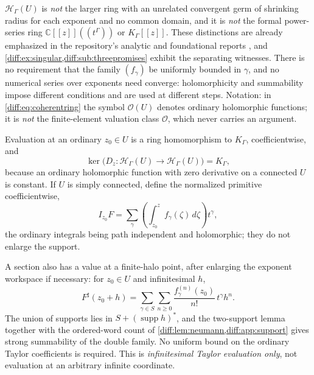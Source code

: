 \documentclass[11pt,letterpaper]{article}
\numberwithin{equation}{section}
\theoremstyle{definition}
\theoremstyle{remark}
\newcommand{\C}{\mathbb C}
\newcommand{\Ofin}{\mathcal O}
\newcommand{\supp}{\operatorname{supp}}
\newcommand{\Hring}{\mathscr H}
\newcommand{\Hol}{\mathscr O}
\newcommand{\Dz}{D_{z}}
\newcommand{\Ker}{\operatorname{ker}}
\begin{document}
\begin{warning}
\label{diff:warn:ringneighbours}
$\Hring_{\Gamma}(U)$ is \emph{not} the larger ring with an unrelated
convergent germ of shrinking radius for each exponent and no common domain,
and it is \emph{not} the formal power-series ring $\C[[z]]((t^{\Gamma}))$ or
$K_{\Gamma}[[z]]$. These distinctions are already emphasized in the
repository's analytic and foundational reports
\cite{RepoAnalysis,RepoFound,RepoCatalogue}, and
\cref{diff:ex:singular,diff:sub:threepromises} exhibit the separating
witnesses. There is no requirement that the family $(f_{\gamma})$ be uniformly
bounded in $\gamma$, and no numerical series over exponents need converge:
holomorphicity and summability impose different conditions and are used at
different steps. Notation: in \cref{diff:eq:coherentring} the symbol
$\Hol(U)$ denotes ordinary holomorphic functions; it is \emph{not} the
finite-element valuation class $\Ofin$, which never carries an argument.
\end{warning}

Evaluation at an ordinary $z_{0}\in U$ is a ring homomorphism to $K_{\Gamma}$,
coefficientwise, and
\begin{equation}\label{diff:eq:coherentconstants}
 \Ker\bigl(\Dz:\Hring_{\Gamma}(U)\to\Hring_{\Gamma}(U)\bigr)=K_{\Gamma},
\end{equation}
because an ordinary holomorphic function with zero derivative on a connected
$U$ is constant. If $U$ is simply connected, define the normalized primitive
coefficientwise,
\[
 I_{z_{0}}F=\sum_{\gamma}\left(\int_{z_{0}}^{z}f_{\gamma}(\zeta)\,d\zeta\right)
 t^{\gamma},
\]
the ordinary integrals being path independent and holomorphic; they do not
enlarge the support.

A section also has a value at a finite-halo point, after enlarging the
exponent workspace if necessary: for $z_{0}\in U$ and infinitesimal $h$,
\begin{equation}\label{diff:eq:halo}
 F^{\sharp}(z_{0}+h)=\sum_{\gamma\in S}\sum_{n\geq0}
 \frac{f_{\gamma}^{(n)}(z_{0})}{n!}\,t^{\gamma}h^{n}.
\end{equation}
The union of supports lies in $S+(\supp h)^{*}$, and the two-support lemma
together with the ordered-word count of
\cref{diff:lem:neumann,diff:app:support} gives strong summability of the double
family. No uniform bound on the ordinary Taylor coefficients is required. This
is \emph{infinitesimal Taylor evaluation only}, not evaluation at an arbitrary
infinite coordinate.
\end{document}
